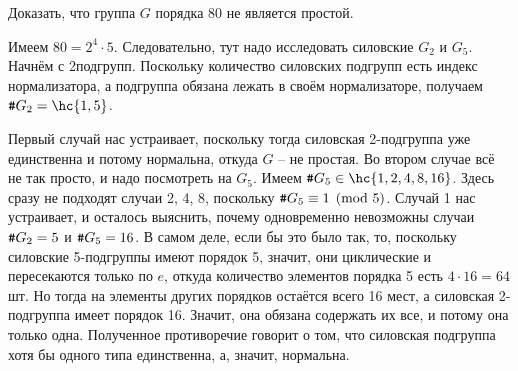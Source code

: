 \documentclass[a4paper]{article}
\begin{document}
\begin{problem}
Доказать, что группа $G$ порядка 80 не является простой.
\end{problem}
\begin{solution}
Имеем $80=2^4\cdot 5$. Следовательно, тут надо исследовать силовские $G_2$ и $G_5$. Начнём с
2\д подгрупп. Поскольку количество силовских подгрупп есть индекс нормализатора, а подгруппа обязана
лежать в своём нормализаторе, получаем $\verb"#" G_2 = \hc{1, 5}$.

Первый случай нас устраивает, поскольку тогда силовская 2-подгруппа уже единственна и потому нормальна,
откуда $G$ -- не простая. Во втором случае всё не так просто,
и надо посмотреть на $G_5$. Имеем $\verb"#" G_5 \in \hc{1, 2, 4, 8, 16}$.
Здесь сразу не подходят случаи 2, 4, 8, поскольку $\verb"#" G_5 \equiv 1 \pmod 5$. Случай 1 нас устраивает, и
осталось выяснить, почему одновременно невозможны случаи $\verb"#" G_2 = 5$ и $\verb"#" G_5 = 16$. В самом
деле, если бы это было так, то, поскольку силовские 5-подгруппы имеют порядок 5, значит, они циклические и
пересекаются только по $e$, откуда количество элементов порядка 5 есть $4 \cdot 16=64$ шт. Но тогда на
элементы других порядков остаётся всего 16 мест, а силовская 2-подгруппа имеет порядок 16. Значит, она
обязана содержать их все, и потому она только одна. Полученное противоречие говорит о том, что силовская
подгруппа хотя бы одного типа единственна, а, значит, нормальна.
\end{solution}
\end{document}
